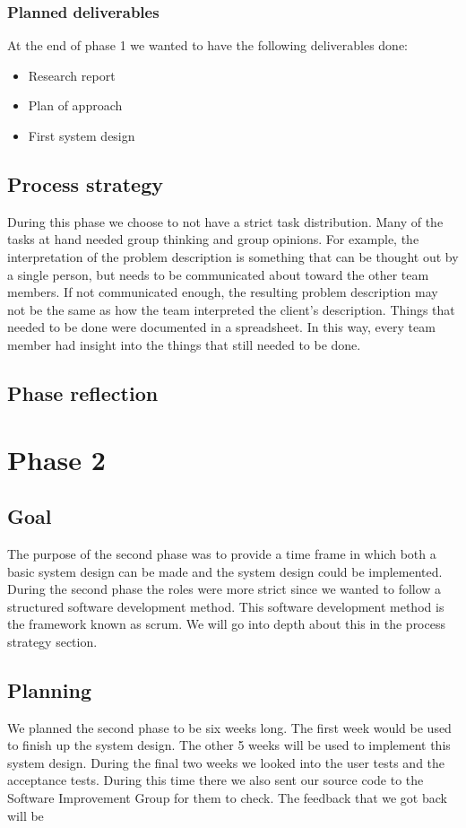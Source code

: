 \subsubsection{Planned deliverables}
At the end of phase 1 we wanted to have the following deliverables done:
\begin{itemize}
\item Research report
\item Plan of approach
\item First system design
\end{itemize}

\subsection{Process strategy}
During this phase we choose to not have a strict task distribution.
Many of the tasks at hand needed group thinking and group opinions.
For example, the interpretation of the problem description is something that can be thought out by a single person, but needs to be communicated about toward the other team members.
If not communicated enough, the resulting problem description may not be the same as how the team interpreted the client's description.
Things that needed to be done were documented in a spreadsheet.
In this way, every team member had insight into the things that still needed to be done.

\subsection{Phase reflection}

\section{Phase 2}
\subsection{Goal}
The purpose of the second phase was to provide a time frame in which both a basic system design can be made and the system design could be implemented.
During the second phase the roles were more strict since we wanted to follow a structured software development method.
This software development method is the framework known as scrum.
We will go into depth about this in the process strategy section.

\subsection{Planning}
We planned the second phase to be six weeks long.
The first week would be used to finish up the system design.
The other 5 weeks will be used to implement this system design.
During the final two weeks we looked into the user tests and the acceptance tests.
During this time there we also sent our source code to the Software Improvement Group for them to check.
The feedback that we got back will be 

